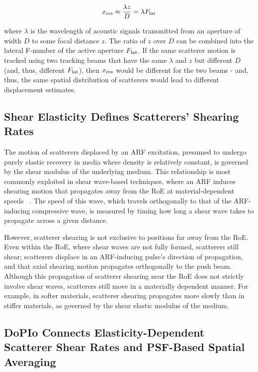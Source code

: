 \begin{equation}
x_{\textnormal{res}} \approx \frac{\lambda z}{D} = \lambda F_{\textnormal{lat}}
\label{eq:rescell}
\end{equation}

\noindent{}where $\lambda$ is the wavelength of acoustic signals transmitted from an aperture of width $D$ to some focal distance $z$. The ratio of $z$ over $D$ can be combined into the lateral F-number of the active aperture $F_{\textnormal{lat}}$. If the same scatterer motion is tracked using two tracking beams that have the same $\lambda$ and $z$ but different $D$ (and, thus, different $F_{\textnormal{lat}}$), then $x_{\textnormal{res}}$ would be different for the two beams - and, thus, the same spatial distribution of scatterers would lead to different displacement estimates.

\subsection{Shear Elasticity Defines Scatterers' Shearing Rates}

The motion of scatterers displaced by an ARF excitation, presumed to undergo purely elastic recovery in media where density is relatively constant, is governed by the shear modulus of the underlying medium. This relationship is most commonly exploited in shear wave-based techniques, where an ARF induces shearing motion that propagates away from the RoE at material-dependent speeds~
\cite{sarvazyan_Shear_1998, ostrovsky_NonDissipative_2006,sarvazyan_Acoustic_2021}. The speed of this wave, which travels orthogonally to that of the ARF-inducing compressive wave, is measured by timing how long a shear wave takes to propagate across a given distance.

However, scatterer shearing is not exclusive to positions far away from the RoE. Even within the RoE, where shear waves are not fully formed, scatterers still shear; scatterers displace in an ARF-inducing pulse's direction of propagation, and that axial shearing motion propagates orthogonally to the push beam. Although this propagation of scatterer shearing near the RoE does not strictly involve shear waves, scatterers still move in a materially dependent manner. For example, in softer materials, scatterer shearing propagates more slowly than in stiffer materials, as governed by the shear elastic modulus of the medium. 

\subsection{DoPIo Connects Elasticity-Dependent Scatterer Shear Rates and PSF-Based Spatial Averaging}

